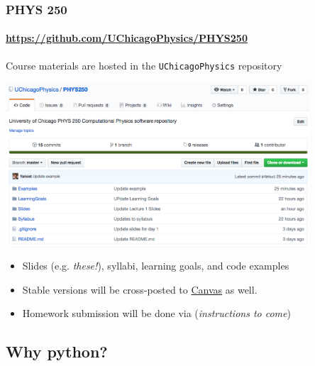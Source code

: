 \documentclass[hyperref={colorlinks=true}]{beamer}
\begin{document}

\begin{frame}%
  \frametitle{PHYS 250 \github}
  \framesubtitle{\url{https://github.com/UChicagoPhysics/PHYS250}}
  
  Course materials are hosted in the \github \texttt{UChicagoPhysics} repository
  
  \begin{center}
    \includegraphics[width=0.85\textwidth]{PHYS250-GitHub.png}
  \end{center}

  \vspace{-0.5cm}

  \begin{itemize}
    \item Slides (e.g. \textit{these!}), syllabi, learning goals, and code examples
    \item Stable versions will be cross-posted to \href{\CanvasURL}{Canvas} as well.
    \item Homework submission will be done via \github (\textit{instructions to come})
  \end{itemize}
  
  
\end{frame}


\subsection[Why python?]{Why python?}
\end{document}
